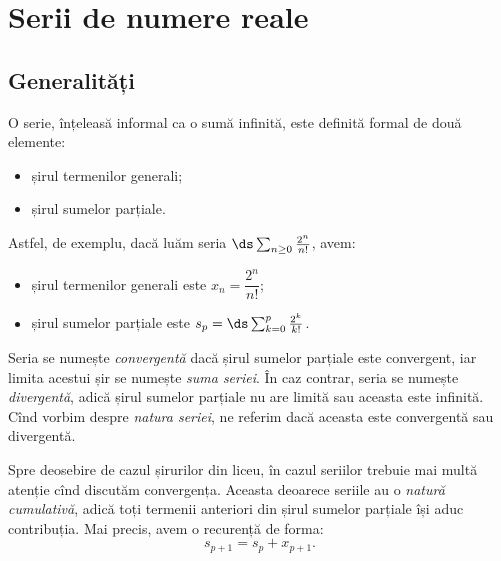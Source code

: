 \chapter{Serii de numere reale}

\section{Generalități}

O serie, înțeleasă informal ca o sumă infinită, este definită formal de două elemente:
\begin{itemize}  
\item șirul termenilor generali;
\item șirul sumelor parțiale.
\end{itemize}

Astfel, de exemplu, dacă luăm seria $ \ds\sum_{n \geq 0} \frac{2^n}{n!} $, avem:
\begin{itemize}
\item șirul termenilor generali este $ x_n = \dfrac{2^n}{n!} $;
\item șirul sumelor parțiale este $ s_p = \ds\sum_{k = 0}^p \frac{2^k}{k!} $.
\end{itemize}

Seria se numește \emph{convergentă} dacă șirul sumelor parțiale este convergent,
iar limita acestui șir se numește \emph{suma seriei}. În caz contrar, seria
se numește \emph{divergentă}, adică șirul sumelor parțiale nu are limită sau
aceasta este infinită. Cînd vorbim despre \emph{natura seriei}, ne referim
dacă aceasta este convergentă sau divergentă.
 

Spre deosebire de cazul șirurilor din liceu, în cazul seriilor trebuie
mai multă atenție cînd discutăm convergența. Aceasta deoarece seriile au
o \emph{natură cumulativă}, adică toți termenii anteriori din șirul sumelor
parțiale își aduc contribuția. Mai precis, avem o recurență de forma:
\[
  s_{p + 1} = s_p + x_{p + 1}.
\]

